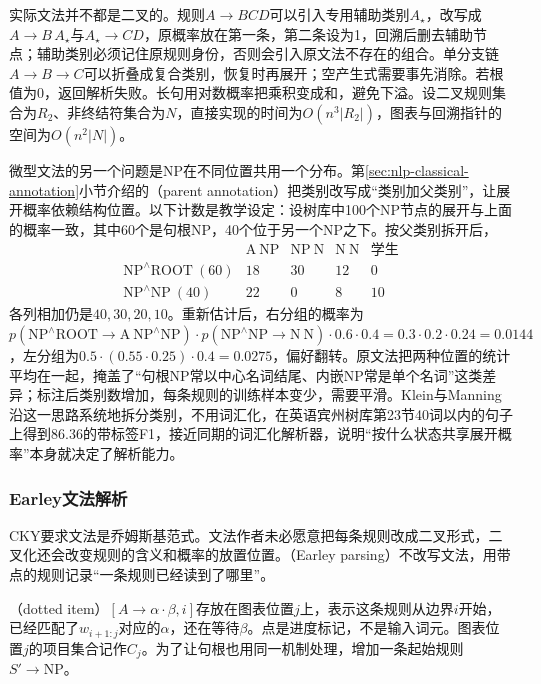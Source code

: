 实际文法并不都是二叉的。规则$A\to BCD$可以引入专用辅助类别$A_\star$，改写成$A\to B\,A_\star$与$A_\star\to CD$，原概率放在第一条，第二条设为1，回溯后删去辅助节点；辅助类别必须记住原规则身份，否则会引入原文法不存在的组合。单分支链$A\to B\to C$可以折叠成复合类别，恢复时再展开；空产生式需要事先消除。若根值为0，返回解析失败。长句用对数概率把乘积变成和，避免下溢。设二叉规则集合为$R_2$、非终结符集合为$N$，直接实现的时间为$O(n^3|R_2|)$，图表与回溯指针的空间为$O(n^2|N|)$。

微型文法的另一个问题是NP在不同位置共用一个分布。第\ref{sec:nlp-classical-annotation}小节介绍的（parent annotation）把类别改写成“类别加父类别”，让展开概率依赖结构位置。以下计数是教学设定：设树库中100个NP节点的展开与上面的概率一致，其中60个是句根NP，40个位于另一个NP之下。按父类别拆开后，
\[
\begin{array}{lcccc}
 &\mathrm A\ \mathrm{NP}&\mathrm{NP}\ \mathrm N&\mathrm N\ \mathrm N&\text{学生}\\
 \mathrm{NP}^{\wedge}\mathrm{ROOT}\ (60)&18&30&12&0\\
 \mathrm{NP}^{\wedge}\mathrm{NP}\ (40)&22&0&8&10
\end{array}
\]
各列相加仍是$40,30,20,10$。重新估计后，右分组的概率为$p(\mathrm{NP}^{\wedge}\mathrm{ROOT}\to\mathrm A\ \mathrm{NP}^{\wedge}\mathrm{NP})\cdot p(\mathrm{NP}^{\wedge}\mathrm{NP}\to\mathrm N\ \mathrm N)\cdot0.6\cdot0.4=0.3\cdot0.2\cdot0.24=0.0144$，左分组为$0.5\cdot(0.55\cdot0.25)\cdot0.4=0.0275$，偏好翻转。原文法把两种位置的统计平均在一起，掩盖了“句根NP常以中心名词结尾、内嵌NP常是单个名词”这类差异；标注后类别数增加，每条规则的训练样本变少，需要平滑。Klein与Manning沿这一思路系统地拆分类别，不用词汇化，在英语宾州树库第23节40词以内的句子上得到86.36的带标签F1，接近同期的词汇化解析器，说明“按什么状态共享展开概率”本身就决定了解析能力。

\subsubsection{Earley文法解析}
\label{sec:nlp-analysis-earley}

CKY要求文法是乔姆斯基范式。文法作者未必愿意把每条规则改成二叉形式，二叉化还会改变规则的含义和概率的放置位置。（Earley parsing）不改写文法，用带点的规则记录“一条规则已经读到了哪里”。

（dotted item）$[A\to\alpha\cdot\beta,i]$存放在图表位置$j$上，表示这条规则从边界$i$开始，已经匹配了$w_{i+1:j}$对应的$\alpha$，还在等待$\beta$。点是进度标记，不是输入词元。图表位置$j$的项目集合记作$C_j$。为了让句根也用同一机制处理，增加一条起始规则$S'\to\mathrm{NP}$。

